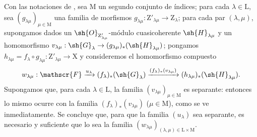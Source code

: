 \begin{env}[11.9.2]
\label{IV.11.9.2}
Con las notaciones de , sea $\mathrm{M}$ un segundo conjunto de índices; para cada $\lambda\in\mathrm{L}$, sea $(g_{\lambda\mu})_{\mu\in\mathrm{M}}$ una familia de morfismos $g_{\lambda\mu}:\mathrm{Z}'_{\lambda\mu}\to\mathrm{Z}_\lambda$; para cada par $(\lambda,\mu)$, supongamos dados un $\sh{O}_{\mathrm{Z}'_{\lambda\mu}}$-módulo cuasicoherente $\sh{H}_{\lambda\mu}$ y un homomorfismo $v_{\lambda\mu}:\sh{G}_\lambda\to(g_{\lambda\mu})_*(\sh{H}_{\lambda\mu})$; pongamos $h_{\lambda\mu}=f_\lambda\circ g_{\lambda\mu}:\mathrm{Z}'_{\lambda\mu}\to\mathrm{X}$ y consideremos el homomorfismo compuesto
\[
  w_{\lambda\mu}:\mathscr{F}\xrightarrow{u_\lambda}(f_\lambda)_*(\sh{G}_\lambda)\xrightarrow{(f_\lambda)_*(v_{\lambda\mu})}(h_{\lambda\mu})_*(\sh{H}_{\lambda\mu}).
\]
Supongamos que, para cada $\lambda\in\mathrm{L}$, la familia $(v_{\lambda\mu})_{\mu\in\mathrm{M}}$ es separante: entonces lo mismo ocurre con la familia $(f_\lambda)_*(v_{\lambda\mu})$ ($\mu\in\mathrm{M}$), como se ve inmediatamente.
Se concluye que, para que la familia $(u_\lambda)$ sea separante, es necesario y suficiente que lo sea la familia $(w_{\lambda\mu})_{(\lambda,\mu)\in\mathrm{L}\times\mathrm{M}}$.
\end{env}


